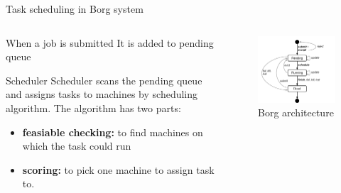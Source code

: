 \documentclass[10pt,xcolor={dvipsnames}, aspectratio=169]{beamer}
\begin{document}
\begin{frame}
{Task scheduling in Borg system}
		\begin{columns}[T] %
			\begin{column}{.48\textwidth}
			\begin{block}
			{When a job is submitted}
			It is added to pending queue
			\end{block}
			\begin{block}
			{Scheduler}
			Scheduler scans the pending queue and assigns tasks to machines by scheduling algorithm. 
			The algorithm has two parts: 
			\begin{itemize}
				\item \textbf{feasiable checking: } to find machines on which the task could run
				\item \textbf{scoring: } to pick one machine to assign task to.
			\end{itemize}
			\end{block}
		\end{column}%
		\hfill%
		\begin{column}{.48\textwidth}
			\begin{figure}
				\centering
				\includegraphics[scale=0.5]{images/task_states.png}
				\caption{Borg architecture}
			\end{figure}
		\end{column}%
	\end{columns}
\end{frame}
\end{document}
